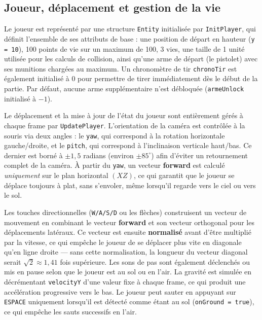 \documentclass[a4paper,11pt]{article}
\begin{document}
\subsection{Joueur, déplacement et gestion de la vie}
\hspace*{1.5em}
Le joueur est représenté par une structure \texttt{Entity} initialisée par \texttt{InitPlayer}, qui définit l'ensemble de ses attributs de base : une position de départ en hauteur (\texttt{y = 10}), 100 points de vie sur un maximum de 100, 3 vies, une taille de 1 unité utilisée pour les calculs de collision, ainsi qu'une arme de départ (le pistolet) avec ses munitions chargées au maximum. Un chronomètre de tir \texttt{chronoTir} est également initialisé à $0$ pour permettre de tirer immédiatement dès le début de la partie. Par défaut, aucune arme supplémentaire n'est débloquée (\texttt{armeUnlock} initialisé à $-1$).

Le déplacement et la mise à jour de l'état du joueur sont entièrement gérés à chaque frame par \texttt{UpdatePlayer}. L'orientation de la caméra est contrôlée à la souris via deux angles : le \texttt{yaw}, qui correspond à la rotation horizontale gauche/droite, et le \texttt{pitch}, qui correspond à l'inclinaison verticale haut/bas. Ce dernier est borné à $\pm 1{,}5$ radians (environ $\pm 85^\circ$) afin d'éviter un retournement complet de la caméra. À partir du \texttt{yaw}, un vecteur \textbf{forward} est calculé \textit{uniquement} sur le plan horizontal $(XZ)$, ce qui garantit que le joueur se déplace toujours à plat, sans s'envoler, même lorsqu'il regarde vers le ciel ou vers le sol.

Les touches directionnelles (\texttt{W/A/S/D} ou les flèches) construisent un vecteur de mouvement en combinant le vecteur \textbf{forward} et son vecteur orthogonal pour les déplacements latéraux. Ce vecteur est ensuite \textbf{normalisé} avant d'être multiplié par la vitesse, ce qui empêche le joueur de se déplacer plus vite en diagonale qu'en ligne droite — sans cette normalisation, la longueur du vecteur diagonal serait $\sqrt{2} \approx 1{,}41$ fois supérieure. Les sons de pas sont également déclenchés ou mis en pause selon que le joueur est au sol ou en l'air. La gravité est simulée en décrémentant \texttt{velocityY} d'une valeur fixe à chaque frame, ce qui produit une accélération progressive vers le bas. Le joueur peut sauter en appuyant sur \texttt{ESPACE} uniquement lorsqu'il est détecté comme étant au sol (\texttt{onGround = true}), ce qui empêche les sauts successifs en l'air.
\end{document}
